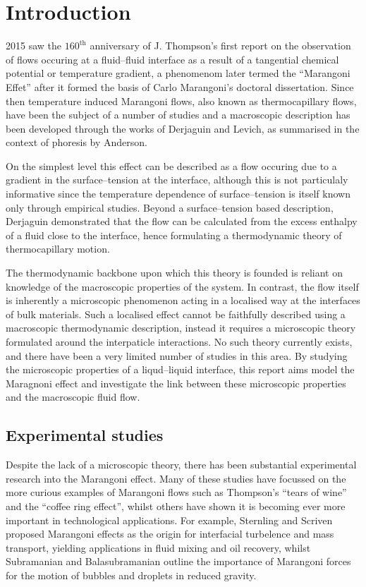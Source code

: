 \section{Introduction}
2015 saw the $160^{\mathrm{th}}$ anniversary of J. Thompson's first report\cite{JThompson} on the observation of flows occuring at a fluid--fluid interface as a result of a tangential chemical potential or temperature gradient, a phenomenom later termed the ``Marangoni Effet'' after it formed the basis of Carlo Marangoni's doctoral dissertation.\cite{Marangoni}
Since then temperature induced Marangoni flows, also known as thermocapillary flows, have been the subject of a number of studies and a macroscopic description has been developed through the works of Derjaguin\cite{SurfaceForces} and Levich\cite{Levich}, as summarised in the context of phoresis by Anderson\cite{Anderson}.

On the simplest level this effect can be described as a flow occuring due to a gradient in the surface--tension at the interface, although this is not particulaly informative since the temperature dependence of surface--tension is itself known only through empirical studies.
Beyond a surface--tension based description, Derjaguin demonstrated that the flow can be calculated from the excess enthalpy of a fluid close to the interface, hence formulating a thermodynamic theory of thermocapillary motion.\cite{SurfaceForces}

The thermodynamic backbone upon which this theory is founded is reliant on knowledge of the macroscopic properties of the system.
In contrast, the flow itself is inherently a microscopic phenomenon acting in a localised way at the interfaces of bulk materials. 
Such a localised effect cannot be faithfully described using a macroscopic thermodynamic description, instead it requires a microscopic theory formulated around the interpaticle interactions. 
No such theory currently exists, and there have been a very limited number of studies in this area.\cite{HolgerBoppHampe}
By studying the microscopic properties of a liqud--liquid interface, this report aims model the Maragnoni effect and investigate the link between these microscopic properties and the macroscopic fluid flow.

\subsection{Experimental studies}
Despite the lack of a microscopic theory, there has been substantial experimental research into the Marangoni effect.
Many of these studies have focussed on the more curious examples of Marangoni flows such as Thompson's ``tears of wine''\cite{JThompson,Venerus,Tadmor,Cazabat1995} and the ``coffee ring effect'',\cite{Sefian,HuLarson,Sefiane2014} whilst others have shown it is becoming ever more important in technological applications.
For example, Sternling and Scriven\cite{SternlingScriven} proposed Marangoni effects as the origin for interfacial turbelence and mass transport, yielding applications in fluid mixing and oil recovery,\cite{Aguilera2005,LyfordA,LyfordB} whilst Subramanian and Balasubramanian outline the importance of Marangoni forces for the motion of bubbles and droplets in reduced gravity.\cite{MotionOfBubblesAndDrops} 

